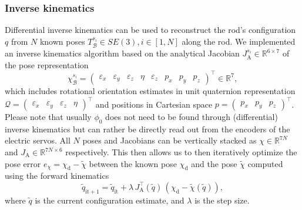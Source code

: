 \subsubsection{Inverse kinematics}\label{ssub:hsamodel:hsa_rod_kinematics:inverse_kinematics}
Differential inverse kinematics can be used to reconstruct the rod's configuration $q$ from $N$ known poses $T_{\mathcal{B}}^{s_i} \in SE(3), i \in [1, N]$ along the rod. 
We implemented an inverse kinematics algorithm based on the analytical Jacobian $J_\mathrm{A}^{s_i} \in \mathbb{R}^{6 \times 7}$ of the pose representation
\begin{equation*}
    \chi_{\mathcal{B}}^{s_i} = \begin{pmatrix}
        \varepsilon_x & \varepsilon_y & \varepsilon_z & \eta & \varepsilon_z & p_x & p_y & p_z
    \end{pmatrix}^\top \in \mathbb{R}^{7},
\end{equation*}
which includes rotational orientation estimates in unit quaternion representation $\mathcal{Q} = \begin{pmatrix} \varepsilon_x & \varepsilon_y & \varepsilon_z & \eta \end{pmatrix}^\top$ and positions in Cartesian space $p = \begin{pmatrix} p_x & p_y & p_z \end{pmatrix}^\top$.
Please note that usually $\phi_0$ does not need to be found through (differential) inverse kinematics but can rather be directly read out from the encoders of the electric servos.
All $N$ poses and Jacobians can be vertically stacked as $\chi \in \mathbb{R}^{7N}$  and $J_\mathrm{A} \in \mathbb{R}^{7N \times 6}$  respectively. This then allows us to then iteratively optimize the pose error $e_\chi = \chi_\mathrm{d} - \tilde{\chi}$ between the known pose $\chi_\mathrm{d}$ and the pose $\tilde{\chi}$ computed using the forward kinematics
\begin{equation}
    \tilde{q}_{\mathrm{it} + 1} = \tilde{q}_{\mathrm{it}} + \lambda \, J_\mathrm{A}^\top(\tilde{q}) \, \left ( \chi_\mathrm{d} - \tilde{\chi}(\tilde{q}) \right ),
\end{equation}
where $\tilde{q}$ is the current configuration estimate, and $\lambda$ is the step size.

